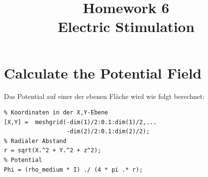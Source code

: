 \documentclass[conference]{IEEEtran}
\begin{document}
%
%
\title{Homework 6\\ Electric Stimulation}

\author{
}


\maketitle

\IEEEpeerreviewmaketitle

\section{Calculate the Potential Field}

Das Potential auf einer der ebenen Fläche wird wie folgt berechnet:
\begin{lstlisting}
% Koordinaten in der X,Y-Ebene
[X,Y] =  meshgrid(-dim(1)/2:0.1:dim(1)/2,...
				  -dim(2)/2:0.1:dim(2)/2);
% Radialer Abstand
r = sqrt(X.^2 + Y.^2 + z^2);
% Potential
Phi = (rho_medium * I) ./ (4 * pi .* r);
\end{lstlisting}
\end{document}
